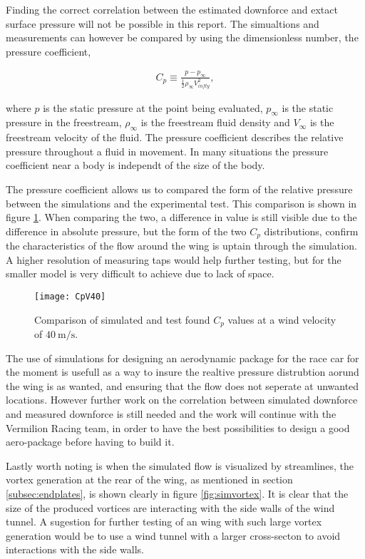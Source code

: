   Finding the correct correlation between the estimated downforce and extact surface pressure will not be possible in this report. The simualtions and measurements can however be compared by using the dimensionless number, the pressure coefficient,

  \begin{align}
    C_p \equiv \frac{p-p_{\infty}}{\frac{1}{2}\rho_{\infty}V_{infty}^2},
  \end{align}

  where $p$ is the static pressure at the point being evaluated, $p_{\infty}$ is the static pressure in the freestream, $\rho_{\infty}$ is the freestream fluid density and $V_{\infty}$ is the freestream velocity of the fluid. The pressure coefficient describes the relative pressure throughout a fluid in movement. In many situations the pressure coefficient near a body is independt of the size of the body. 

  The pressure coefficient allows us to compared the form of the relative pressure between the simulations and the experimental test. This comparison is shown in figure \ref{fig:CpV40}. When comparing the two, a difference in value is still visible due to the difference in absolute pressure, but the form of the two $C_p$ distributions, confirm the characteristics of the flow around the wing is uptain through the simulation. A higher resolution of measuring taps would help further testing, but for the smaller model is very difficult to achieve due to lack of space. 

  \begin{figure}
    \texttt{[image: CpV40]}
    \caption{Comparison of simulated and test found $C_p$ values at a wind velocity of $\SI{40}{\metre\per\second}$.}
    \label{fig:CpV40}
  \end{figure}

  The use of simulations for designing an aerodynamic package for the race car for the moment is usefull as a way to insure the realtive pressure distrubtion aorund the wing is as wanted, and ensuring that the flow does not seperate at unwanted locations. However further work on the correlation between simulated downforce and measured downforce is still needed and the work will continue with the Vermilion Racing team, in order to have the best possibilities to design a good aero-package before having to build it.

  Lastly worth noting is when the simulated flow is visualized by streamlines, the vortex generation at the rear of the wing, as mentioned in section \ref{subsec:endplates}, is shown clearly in figure \ref{fig:simvortex}. It is clear that the size of the produced vortices are interacting with the side walls of the wind tunnel. A sugestion for further testing of an wing with such large vortex generation would be to use a wind tunnel with a larger cross-secton to avoid interactions with the side walls.

